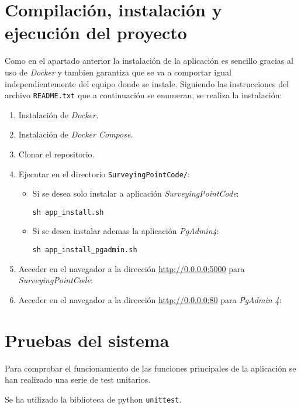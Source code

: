 \section{Compilación, instalación y ejecución del proyecto}\label{sec:instalacion}

Como en el apartado anterior la instalación de la aplicación es sencillo gracias al uso de \emph{Docker} y tambien garantiza que se va a comportar igual independientemente del equipo donde se instale. Siguiendo las instrucciones del archivo \texttt{README.txt} que a continuación se enumeran, se realiza la instalación:

\begin{enumerate}
\item Instalación de \emph{Docker.}
\item Instalación de \emph{Docker Compose.}
\item Clonar el repositorio.
\item Ejecutar en el directorio \texttt{SurveyingPointCode/}:

\begin{itemize}
\item Si se desea solo instalar a aplicación \emph{SurveyingPointCode}:

\texttt{sh app\_install.sh}

\item Si se desea instalar ademas la aplicación \emph{PgAdmin4}:

\texttt{sh app\_install\_pgadmin.sh}

\end{itemize}

\item Acceder en el navegador a la dirección \url{http://0.0.0.0:5000} para \emph{SurveyingPointCode}:

\item Acceder en el navegador a la dirección \url{http://0.0.0.0:80} para \emph{PgAdmin 4}:

\end{enumerate}


\section{Pruebas del sistema}

Para comprobar el funcionamiento de las funciones principales de la aplicación se han realizado una serie de test unitarios. 

Se ha utilizado la biblioteca de python \texttt{unittest}.

